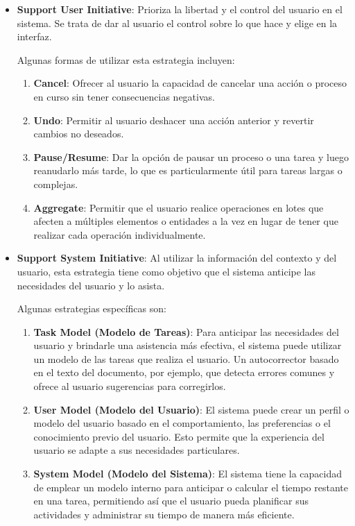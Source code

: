\documentclass{article}
\begin{document}
		
		\begin{itemize}		
			\item \textbf{Support User Initiative}:
			Prioriza la libertad y el control del usuario en el sistema. Se trata de dar al usuario el control sobre lo que hace y elige en la interfaz. 
			
			Algunas formas de utilizar esta estrategia incluyen:
			\begin{enumerate}
				\item \textbf{Cancel}: Ofrecer al usuario la capacidad de cancelar una acción o proceso en curso sin tener consecuencias negativas.
				
				\item \textbf{Undo}: Permitir al usuario deshacer una acción anterior y revertir cambios no deseados.
				
				
				\item \textbf{Pause/Resume}: Dar la opción de pausar un proceso o una tarea y luego reanudarlo más tarde, lo que es particularmente útil para tareas largas o complejas.
				
				
				\item \textbf{Aggregate}: Permitir que el usuario realice operaciones en lotes que afecten a múltiples elementos o entidades a la vez en lugar de tener que realizar cada operación individualmente.
				
				
			\end{enumerate}
			
			\item \textbf{Support System Initiative}:
			Al utilizar la información del contexto y del usuario, esta estrategia tiene como objetivo que el sistema anticipe las necesidades del usuario y lo asista.
			
			Algunas estrategias específicas son:
			\begin{enumerate}
				\item \textbf{Task Model (Modelo de Tareas)}: Para anticipar las necesidades del usuario y brindarle una asistencia más efectiva, el sistema puede utilizar un modelo de las tareas que realiza el usuario. Un autocorrector basado en el texto del documento, por ejemplo, que detecta errores comunes y ofrece al usuario sugerencias para corregirlos.
				
				
				\item \textbf{User Model (Modelo del Usuario)}: El sistema puede crear un perfil o modelo del usuario basado en el comportamiento, las preferencias o el conocimiento previo del usuario. Esto permite que la experiencia del usuario se adapte a sus necesidades particulares.
							
				
				\item \textbf{System Model (Modelo del Sistema)}: El sistema tiene la capacidad de emplear un modelo interno para anticipar o calcular el tiempo restante en una tarea, permitiendo así que el usuario pueda planificar sus actividades y administrar su tiempo de manera más eficiente.
				
				
			\end{enumerate}	
			
		\end{itemize}
	
\end{document}

